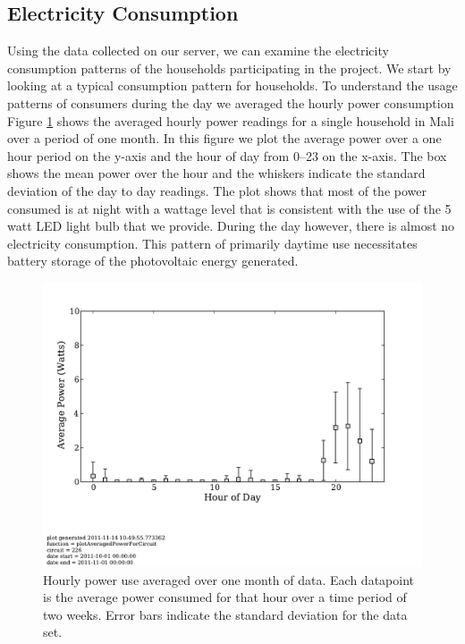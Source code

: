 \documentclass{sig-alternate}
\begin{document}


\subsection{Electricity Consumption}
Using the data collected on our server, we can examine the electricity
consumption patterns of the households participating in the project.
We start by looking at a typical consumption pattern for households.
To understand the usage patterns of consumers during the day
we averaged the hourly power consumption 
Figure \ref{average_power} shows the averaged
hourly power readings for a single household in Mali 
over a period of one month.
In this figure we plot the average power over a one hour period
on the y-axis and the hour of day from 0--23 on the x-axis.
The box shows the mean power over the hour and the whiskers indicate
the standard deviation of the day to day readings.
The plot shows that most of the power consumed is at night with a 
wattage level that is consistent
with the use of the 5 watt LED light bulb that we provide.
During the day however, there is almost no electricity consumption.
This pattern of primarily daytime use necessitates battery storage 
of the photovoltaic energy generated.

\begin{figure}[]
\begin{center}
\includegraphics[trim = 0in 1.3in 0in 0in, clip, width=\columnwidth]
                 {figures/average_power.pdf}
\end{center}
\caption{Hourly power use averaged over one month of data.  Each datapoint is the
average power consumed for that hour over a time period of two weeks.  Error bars
indicate the standard deviation for the data set.}
\label{average_power}
\end{figure}
\end{document}
